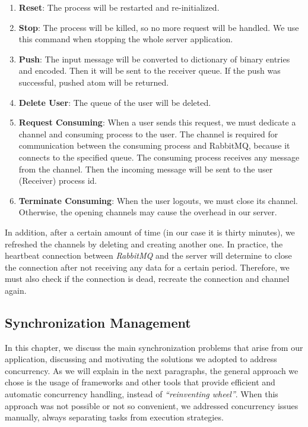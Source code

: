 \begin{enumerate}
	\item \textbf{Reset}: The process will be restarted and re-initialized. 
	\item \textbf{Stop}: The process will be killed, so no more request will be handled. We use this command when stopping the whole server application. 
	\item \textbf{Push}: The input message will be converted to dictionary of binary entries and encoded. Then it will be sent to the receiver queue. If the push was successful, pushed atom will be returned. 
	\item \textbf{Delete User}: The queue of the user will be deleted. 
	\item \textbf{Request Consuming}: When a user sends this request, we must dedicate a channel and consuming process to the user. The channel is required for communication between the consuming process and RabbitMQ, because it connects to the specified queue. The consuming process receives any message from the channel. Then the incoming message will be sent to the user (Receiver) process id.
	\item \textbf{Terminate Consuming}: When the user logouts, we must close its channel. Otherwise, the opening channels may cause the overhead in our server.
\end{enumerate}

In addition, after a certain amount of time (in our case it is thirty minutes), we refreshed the channels by deleting and creating another one. In practice, the heartbeat connection between  \textit{RabbitMQ}  and the server will determine to close the connection after not receiving any data for a certain period. Therefore, we must also check if the connection is dead, recreate the connection and channel again. 

\subsection{Synchronization Management}
In this chapter, we discuss the main synchronization problems that arise from our application, discussing and motivating the solutions we adopted to address concurrency.
As we will explain in the next paragraphs, the general approach we chose is the usage of frameworks and other tools that provide efficient and automatic concurrency handling, instead of \textit{“reinventing wheel”}. When this approach was not possible or not so convenient, we addressed concurrency issues manually, always separating tasks from execution strategies. 

